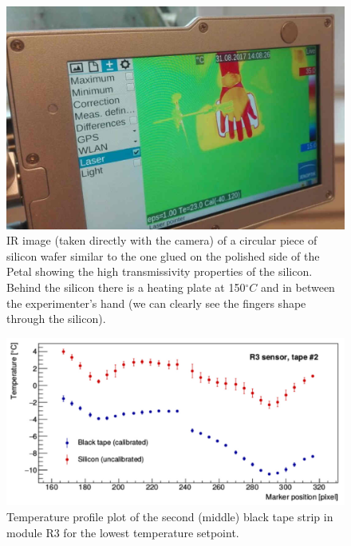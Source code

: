 		\begin{figure}[ht!]
			\centering
			\captionsetup{justification=centering,margin=2cm}
			\includegraphics[scale=0.35]{Figures/Chapter04/HandTransmission.jpg}
			\caption{IR image (taken directly with the camera) of a circular piece of silicon wafer similar to the one glued on the polished side of the Petal showing the high transmissivity properties of the silicon. Behind the silicon there is a heating plate at 150\space$^\circ C$ and in between the experimenter’s hand (we can clearly see the fingers shape through the silicon).}\label{fig4.4}
		\end{figure}
		
		\begin{figure}[ht!]
			\centering
			\captionsetup{justification=centering,margin=2cm}
			\includegraphics[scale=0.35]{Figures/Chapter04/R3Profile_Si_and_BT.jpg}
			\caption{Temperature profile plot of the second (middle) black tape strip in module R3 for the lowest temperature setpoint.}\label{fig4.5}
		\end{figure}
		

